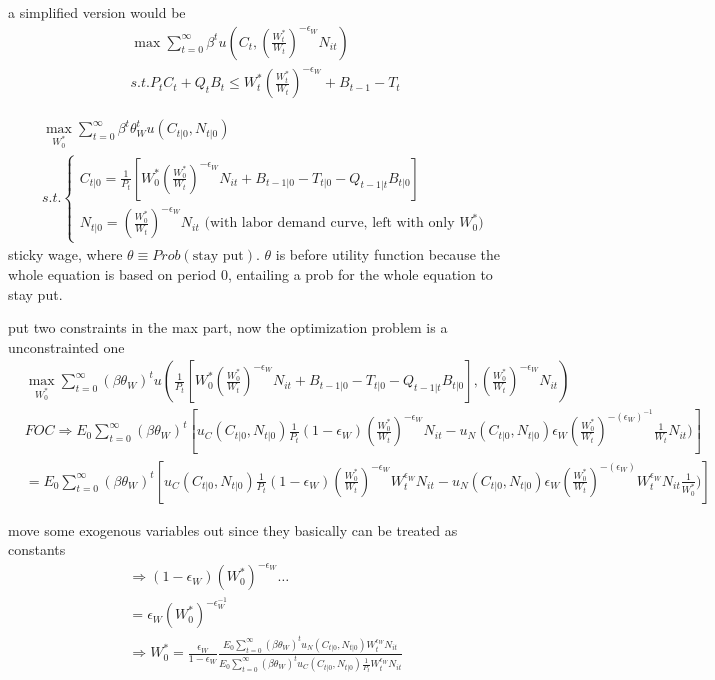 \documentclass{article}
\begin{document}
a simplified version would be 
\begin{equation}
\begin{split}
& \max \sum\limits_{t=0}^{\infty}\beta^t u(C_t,(\frac{W_t^*}{W_t})^{-\epsilon_W}N_{it})
\\& s.t. P_t C_t +Q_t B_t \leqslant W_t^*(\frac{W_t^*}{W_t})^{-\epsilon_W}+B_{t-1}-T_t
\end{split}
\end{equation}


\begin{equation}
\begin{split}
& \max\limits_{W^*_0}  \sum\limits_{t=0}^{\infty}\beta^t \theta_W^t u(C_{t|0},N_{t|0})
\\& s.t. 
\begin{cases}
C_{t|0}=\frac{1}{P_t}[W_0^* (\frac{W_0^*}{W_t})^{-\epsilon_W}N_{it}+B_{t-1|0}-T_{t|0}-Q_{t-1|t}B_{t|0}]
\\
N_{t|0}=(\frac{W^*_0}{W_t})^{-\epsilon_W} N_{it} \text{ (with labor demand curve, left with only $W^*_0$)}
\end{cases}
\end{split}
\end{equation}
sticky wage, where $\theta \equiv Prob(\text{stay put})$. $\theta$ is before utility function because the whole equation is based on period 0, entailing a prob for the whole equation to stay put.


put two constraints in the max part, now the optimization problem is a unconstrainted one
\begin{align}
& \max_{W_0^*} \sum\limits_{t=0}^{\infty} (\beta \theta_W )^t 
u(
{\frac{1}{P_t}[W_0^* (\frac{W_0^*}{W_t})^{-\epsilon_W}N_{it}+B_{t-1|0}-T_{t|0}-Q_{t-1|t}B_{t|0}]},
(\frac{W^*_0}{W_t})^{-\epsilon_W} N_{it}
)
\\& FOC \Rightarrow E_0 \sum\limits_{t=0}^{\infty} (\beta \theta_W)^t [u_C(C_{t|0},N_{t|0})\frac{1}{P_t}(1-\epsilon_W)(\frac{W_0^*}{W_t})^{-\epsilon_W}N_{it}-
u_N(C_{t|0},N_{t|0}) \epsilon_W (\frac{W_0^*}{W_t})^{-(\epsilon_W)^{-1}} \frac{1}{W_t} N_{it})
]
\\& = E_0 \sum_{t=0}^{\infty} (\beta \theta_W)^t [u_C(C_{t|0},N_{t|0})\frac{1}{P_t}(1-\epsilon_W) (\frac{W_0^*}{W_t})^{-\epsilon_W} W_t^{\epsilon_W} N_{it}-
u_N(C_{t|0},N_{t|0}) \epsilon_W (\frac{W_0^*}{W_t})^{-(\epsilon_W)} W_t^{\epsilon_W} N_{it} \frac{1}{W_0^*})
]
\end{align}

move some exogenous variables out since they basically can be treated as constants
\begin{align}
& \Rightarrow  (1-\epsilon_W)(W_0^*)^{-\epsilon_W} \dots  
\\& = \epsilon_W (W_0^*)^{-\epsilon_W^{-1}}
\\& \Rightarrow W_0^*=\frac{\epsilon_W}{1-\epsilon_W}
\frac{E_0 \sum\limits_{t=0}^{\infty} (\beta \theta_W)^t u_N(C_{t|0},N_{t|0})W_t^{\epsilon_W}N_{it}}{E_0 \sum\limits_{t=0}^{\infty} (\beta \theta_W)^t u_C(C_{t|0},N_{t|0})\frac{1}{P_t} W_t^{\epsilon_W} N_{it}}
\end{align}
\end{document}
